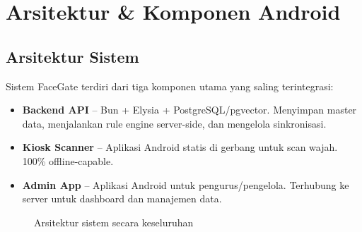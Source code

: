 \documentclass[12pt,a4paper]{article}
\newcommand{\appname}{FaceGate}
\begin{document}
\section{Arsitektur \& Komponen Android}

\subsection{Arsitektur Sistem}

Sistem \appname{} terdiri dari tiga komponen utama yang saling terintegrasi:

\begin{itemize}[nolistsep]
  \item \textbf{Backend API} -- Bun + Elysia + PostgreSQL/pgvector. Menyimpan master data, menjalankan rule engine server-side, dan mengelola sinkronisasi.
  \item \textbf{Kiosk Scanner} -- Aplikasi Android statis di gerbang untuk scan wajah. 100\% offline-capable.
  \item \textbf{Admin App} -- Aplikasi Android untuk pengurus/pengelola. Terhubung ke server untuk dashboard dan manajemen data.
\end{itemize}

\begin{figure}[H]
  \centering
  \caption{Arsitektur sistem secara keseluruhan}
\end{figure}
\end{document}
